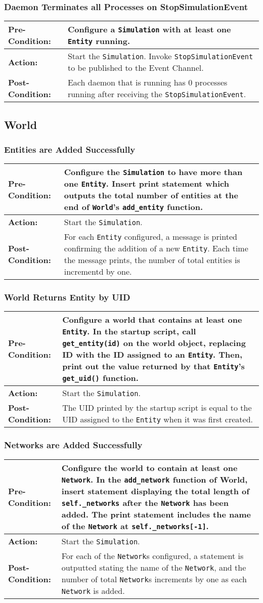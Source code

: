 \documentclass[titlepage]{article}
\newcommand{\testcase}[3]{
    \begin{center}
    \begin{tabular}{| l | p{0.7\textwidth}|}
        \hline
        \rowcolor[gray]{0.8}\textbf{Pre-Condition:} & #1 \\ \hline
        \textbf{Action:} & #2 \\ \hline
        \rowcolor[gray]{0.8}\textbf{Post-Condition:} & #3 \\ \hline
    \end{tabular}
    \end{center}
}
\begin{document}
\subsubsection{Daemon Terminates all Processes on StopSimulationEvent}
\testcase{Configure a \texttt{Simulation} with at least one \texttt{Entity} running.}{Start the \texttt{Simulation}. Invoke \texttt{StopSimulationEvent} to be published to the Event Channel.}{Each daemon that is running has 0 processes running after receiving the \texttt{StopSimulationEvent}.}

\subsection{World}
\subsubsection{Entities are Added Successfully}
\testcase{Configure the \texttt{Simulation} to have more than one \texttt{Entity}.  Insert print statement which outputs the total number of entities at the end of \texttt{World}'s \texttt{add\_entity} function.}{Start the \texttt{Simulation}.}{For each \texttt{Entity} configured, a message is printed confirming the addition of a new \texttt{Entity}.  Each time the message prints, the number of total entities is incrementd by one.}

\subsubsection{World Returns Entity by UID}
\testcase{Configure a world that contains at least one \texttt{Entity}. In the startup script, call \texttt{get\_entity(id)} on the world object, replacing ID with the ID assigned to an \texttt{Entity}. Then, print out the value returned by that \texttt{Entity}'s  \texttt{get\_uid()} function.}{Start the \texttt{Simulation}.}{The UID printed by the startup script is equal to the UID assigned to the \texttt{Entity} when it was first created.}

\subsubsection{Networks are Added Successfully}
\testcase{Configure the world to contain at least one \texttt{Network}.  In the \texttt{add\_network} function of World, insert statement displaying the total length of \texttt{self.\_networks} after the \texttt{Network} has been added. The print statement includes the name of the \texttt{Network} at \texttt{self.\_networks[-1]}.}{Start the \texttt{Simulation}.}{For each of the \texttt{Network}s configured, a statement is outputted stating the name of the \texttt{Network}, and the number of total \texttt{Network}s increments by one as each \texttt{Network} is added.}
\end{document}
